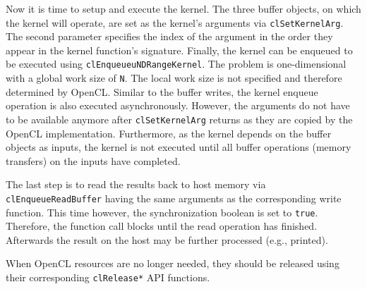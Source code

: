 Now it is time to setup and execute the kernel. The three buffer objects, on which the kernel will operate, are set as the kernel's arguments via \lstinline!clSetKernelArg!. The second parameter specifies the index of the argument in the order they appear in the kernel function's signature. Finally, the kernel can be enqueued to be executed using \lstinline!clEnqueueuNDRangeKernel!. The problem is one-dimensional with a global work size of \lstinline!N!. The local work size is not specified and therefore determined by OpenCL. Similar to the buffer writes, the kernel enqueue operation is also executed asynchronously. However, the arguments do not have to be available anymore after \lstinline!clSetKernelArg! returns as they are copied by the OpenCL implementation. Furthermore, as the kernel depends on the buffer objects as inputs, the kernel is not executed until all buffer operations (memory transfers) on the inputs have completed.

The last step is to read the results back to host memory via \lstinline!clEnqueueReadBuffer! having the same arguments as the corresponding write function. This time however, the synchronization boolean is set to \lstinline!true!. Therefore, the function call blocks until the read operation has finished. Afterwards the result on the host may be further processed (e.g., printed).

When OpenCL resources are no longer needed, they should be released using their corresponding \lstinline!clRelease*! API functions.
